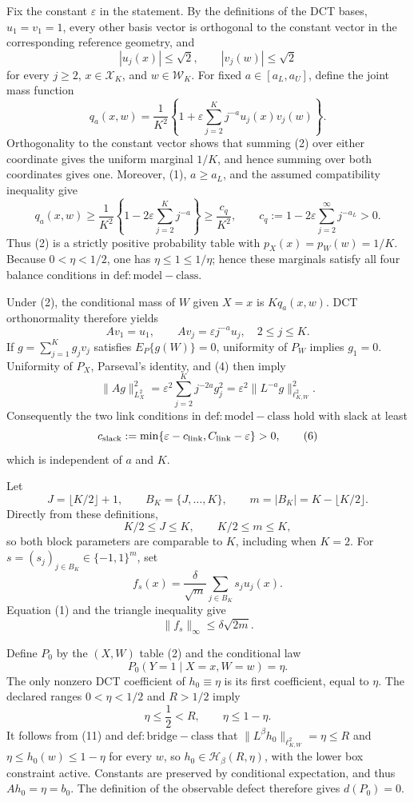 Fix the constant \(\varepsilon\) in the statement.  By the definitions of the DCT bases, \(u_1=v_1=1\), every other basis vector is orthogonal to the constant vector in the corresponding reference geometry, and
\[
 |u_j(x)|\leq \sqrt{2},
 \qquad
 |v_j(w)|\leq \sqrt{2}
 \tag{1}
\]
for every \(j\geq 2\), \(x\in\mathcal X_K\), and \(w\in\mathcal W_K\).  For fixed \(a\in[a_L,a_U]\), define the joint mass function
\[
 q_a(x,w)=\frac{1}{K^2}\left\{1+\varepsilon
       \sum_{j=2}^K j^{-a}u_j(x)v_j(w)\right\}.
 \tag{2}
\]
Orthogonality to the constant vector shows that summing (2) over either coordinate gives the uniform marginal \(1/K\), and hence summing over both coordinates gives one.  Moreover, (1), \(a\geq a_L\), and the assumed compatibility inequality give
\[
 q_a(x,w)
 \geq \frac{1}{K^2}\left\{1-2\varepsilon\sum_{j=2}^Kj^{-a}\right\}
 \geq \frac{c_q}{K^2},
 \qquad
 c_q:=1-2\varepsilon\sum_{j=2}^{\infty}j^{-a_L}>0.
 \tag{3}
\]
Thus (2) is a strictly positive probability table with \(p_X(x)=p_W(w)=1/K\).  Because \(0<\eta<1/2\), one has \(\eta\leq1\leq1/\eta\); hence these marginals satisfy all four balance conditions in \(\mathrm{def:model-class}\).

Under (2), the conditional mass of \(W\) given \(X=x\) is \(Kq_a(x,w)\).  DCT orthonormality therefore yields
\[
 Av_1=u_1,
 \qquad
 Av_j=\varepsilon j^{-a}u_j,
 \quad 2\leq j\leq K.
 \tag{4}
\]
If \(g=\sum_{j=1}^K g_jv_j\) satisfies \(E_P\{g(W)\}=0\), uniformity of \(P_W\) implies \(g_1=0\).  Uniformity of \(P_X\), Parseval's identity, and (4) then imply
\[
 \|Ag\|_{L^2_X}^2
 =\varepsilon^2\sum_{j=2}^Kj^{-2a}g_j^2
 =\varepsilon^2\|L^{-a}g\|_{\ell^2_{K,W}}^2.
 \tag{5}
\]
Consequently the two link conditions in \(\mathrm{def:model-class}\) hold with slack at least
\[
 c_{\mathrm{slack}}
 :=\min\{\varepsilon-c_{\rm link},C_{\rm link}-\varepsilon\}>0,
 \tag{6}
\]
which is independent of \(a\) and \(K\).

Let
\[
 J=\lfloor K/2\rfloor+1,
 \qquad
 B_K=\{J,\ldots,K\},
 \qquad
 m=|B_K|=K-\lfloor K/2\rfloor.
\]
Directly from these definitions,
\[
 K/2\leq J\leq K,
 \qquad
 K/2\leq m\leq K,
 \tag{7}
\]
so both block parameters are comparable to \(K\), including when \(K=2\).  For \(s=(s_j)_{j\in B_K}\in\{-1,1\}^m\), set
\[
 f_s(x)=\frac{\delta}{\sqrt m}\sum_{j\in B_K}s_ju_j(x).
 \tag{8}
\]
Equation (1) and the triangle inequality give
\[
 \|f_s\|_\infty\leq\delta\sqrt{2m}.
 \tag{9}
\]

Define \(P_0\) by the \((X,W)\) table (2) and the conditional law
\[
 P_0(Y=1\mid X=x,W=w)=\eta.
 \tag{10}
\]
The only nonzero DCT coefficient of \(h_0\equiv\eta\) is its first coefficient, equal to \(\eta\).  The declared ranges \(0<\eta<1/2\) and \(R>1/2\) imply
\[
 \eta\leq\frac12<R,
 \qquad
 \eta\leq1-\eta.
 \tag{11}
\]
It follows from (11) and \(\mathrm{def:bridge-class}\) that
\(\|L^\beta h_0\|_{\ell^2_{K,W}}=\eta\leq R\) and
\(\eta\leq h_0(w)\leq1-\eta\) for every \(w\), so
\(h_0\in\mathcal H_\beta(R,\eta)\), with the lower box constraint active.  Constants are preserved by conditional expectation, and thus \(Ah_0=\eta=b_0\).  The definition of the observable defect therefore gives \(d(P_0)=0\).

